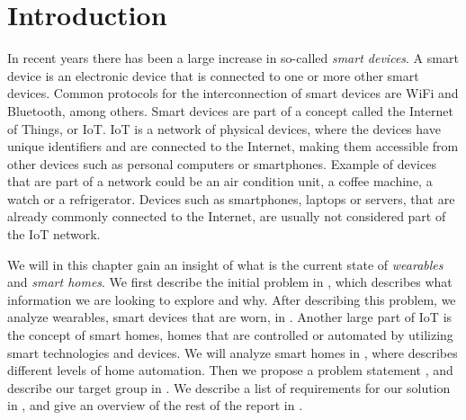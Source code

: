 \chapter{Introduction}\label{chap:introduction}
In recent years there has been a large increase in so-called \emph{smart devices}. 
A smart device is an electronic device that is connected to one or more other smart devices. 
Common protocols for the interconnection of smart devices are WiFi and Bluetooth, among others.
Smart devices are part of a concept called the Internet of Things, or IoT. 
IoT is a network of physical devices, 
where the devices have unique identifiers and are connected to the Internet, 
making them accessible from other devices such as personal computers or smartphones. 
Example of devices that are part of a network could be an air condition unit, a coffee machine, a watch or a refrigerator. 
Devices such as smartphones, laptops or servers, 
that are already commonly connected to the Internet, 
are usually not considered part of the IoT network. 

We will in this chapter gain an insight of what is the current state of \emph{wearables} and \emph{smart homes}. 
We first describe the initial problem in , 
which describes what information we are looking to explore and why. 
After describing this problem, 
we analyze wearables, \ie smart devices that are worn, in .
Another large part of IoT is the concept of smart homes, 
\ie homes that are controlled or automated by utilizing smart technologies and devices. 
We will analyze smart homes in , 
where  describes different levels of home automation. 
Then we propose a problem statement , 
and describe our target group in .
We describe a list of requirements for our solution in ,
and give an overview of the rest of the report in .










